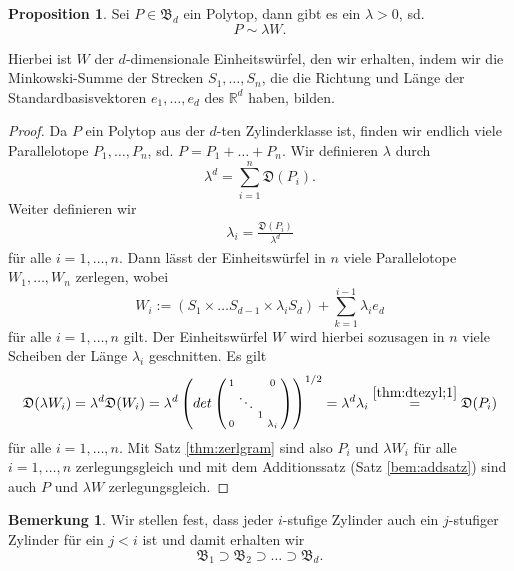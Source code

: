 \documentclass[11pt,titlepage]{article}
\newcommand{\setR}{\mathbb{R}}
\theoremstyle{definition}
\newtheorem{proposition}[theorem]{Proposition}
\newtheorem{remark}[theorem]{Bemerkung}
\theoremstyle{remark}
\begin{document}
	\begin{proposition} \label{bem:dteZylinderklasse}
		Sei $P\in\mathfrak{B}_d$ ein Polytop, dann gibt es ein $\lambda>0$, sd. 
		\[P\sim \lambda W.\] 
	\end{proposition}
	
	Hierbei ist $W$ der $d$-dimensionale Einheitswürfel, den wir erhalten, 
	indem wir die Minkowski-Summe der Strecken $S_1,\ldots,S_n$, 
	die die Richtung und Länge der Standardbasisvektoren $e_1,\ldots, e_d$ 
	des $\setR^d$ haben, bilden.
	
	\begin{proof}
		Da $P$ ein Polytop aus der $d$-ten Zylinderklasse ist, finden 
		wir endlich viele Parallelotope $P_1,\ldots, P_n$, sd. 
		$P=P_1+\ldots+P_n$. Wir definieren $\lambda$ durch 
		\[\lambda^d =\sum_{i=1}^n \mathfrak{D}(P_i).\]
		Weiter definieren wir 
		\begin{align}
			\lambda_i =\frac{\mathfrak{D}(P_i)}{\lambda^d} \label{thm:dtezyl;1}
		\end{align}
		für alle $i=1,\ldots,n$. Dann lässt der Einheitswürfel in $n$ viele 
		Parallelotope $W_1,\ldots,W_n$ zerlegen, wobei
		\[W_i:=(S_1\times\ldots S_{d-1}\times \lambda_i S_d)+
		\sum_{k=1}^{i-1} \lambda_i e_d\]
		für alle $i=1,\ldots,n$ gilt. Der Einheitswürfel $W$ wird hierbei 
		sozusagen in $n$ viele Scheiben der Länge $\lambda_i$ geschnitten. 
		Es gilt 
		\[\mathfrak{D}(\lambda W_i)=\lambda^d \mathfrak{D}(W_i)=
		\lambda^d \left(det \left(\begin{smallmatrix}
		1 & \ &\ &0 \\
		\ &\ddots &\ &\ \\
		\ & \ &  1 &\ \\
		0 & \ & \ & \lambda_i
		\end{smallmatrix}\right)\right)^{1/2}=\lambda^d \lambda_i\overset{\ref{thm:dtezyl;1}}{=}\mathfrak{D}(P_i)\]
		für alle $i=1,\ldots,n$. Mit Satz \ref{thm:zerlgram} 
		sind also $P_i$ und $\lambda W_i$ für alle $i=1,\ldots,n$ zerlegungsgleich 
		und mit dem Additionssatz (Satz \ref{bem:addsatz}) 
		sind auch $P$ und $\lambda W$ zerlegungsgleich.
	\end{proof}
	
	\begin{remark}
		Wir stellen fest, dass jeder $i$-stufige Zylinder auch ein $j$-stufiger 
		Zylinder für ein $j<i$ ist und damit erhalten wir
		\[\mathfrak{B}_1\supset \mathfrak{B}_2\supset \ldots\supset\mathfrak{B}_d.\]
	\end{remark}
	
\end{document}

